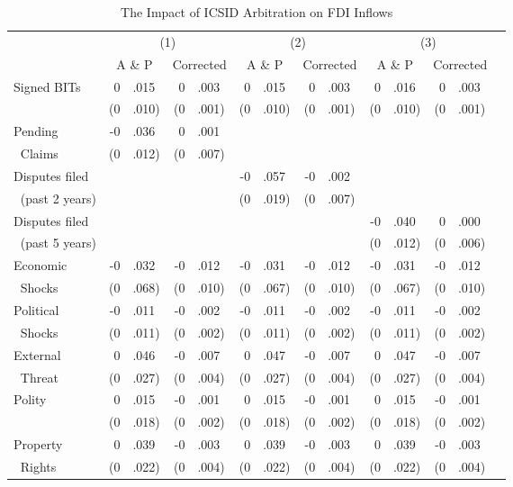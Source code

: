 \documentclass[12pt,onesided]{amsart}
\begin{document}
\begin{table}[ht]
\vspace{1cm}
\centering
{\footnotesize
\caption{The Impact of ICSID Arbitration on FDI Inflows}
\label{tab:allee}
\begin{tabular}{lr@{} lr@{}lr@{}lr@{}lr@{}lr@{}lr@{} }
	\hline\hline
	~ & \multicolumn{4}{c}{(1)} & \multicolumn{4}{c}{(2)} & \multicolumn{4}{c}{(3)} \\	
	~ & \multicolumn{2}{c}{A \& P} & \multicolumn{2}{c}{Corrected} & \multicolumn{2}{c}{A \& P} & \multicolumn{2}{c}{Corrected} & \multicolumn{2}{c}{A \& P} & \multicolumn{2}{c}{Corrected}
	 \\ \hline
	\multirow{2}{*}{Signed BITs} & 0&.015 & 0&.003 & 0&.015 & 0&.003 & 0&.016 & 0&.003 \\
	~ & (0&.010) & (0&.001) & (0&.010) & (0&.001) & (0&.010) & (0&.001) \\
	Pending &-0&.036 &0&.001 && && && \\
	$\;\;$Claims &(0&.012) &(0&.007) && && && \\
	Disputes filed && && &-0&.057 &-0&.002 && && \\
	$\;\;$(past 2 years) && && &(0&.019) &(0&.007) && && \\
	Disputes filed && && && && &-0&.040 &0&.000 \\
	$\;\;$(past 5 years) && && && && &(0&.012) &(0&.006) \\
	Economic & -0&.032 & -0&.012 & -0&.031 & -0&.012 & -0&.031 & -0&.012 \\
	$\;\;$Shocks & (0&.068) & (0&.010) & (0&.067) & (0&.010) & (0&.067) & (0&.010) \\
	Political & -0&.011 & -0&.002 & -0&.011 & -0&.002 & -0&.011 & -0&.002 \\
	$\;\;$Shocks & (0&.011) & (0&.002) & (0&.011) & (0&.002) & (0&.011) &(0&.002) \\
	External & 0&.046 & -0&.007 & 0&.047 & -0&.007 & 0&.047 & -0&.007 \\
	$\;\;$Threat & (0&.027) & (0&.004) & (0&.027) & (0&.004) & (0&.027) & (0&.004) \\
	\multirow{2}{*}{Polity} & 0&.015 & -0&.001 & 0&.015 & -0&.001 & 0&.015 & -0&.001 \\
	~ & (0&.018) & (0&.002) & (0&.018) & (0&.002) & (0&.018) &(0&.002) \\
	Property & 0&.039 & -0&.003 &  0&.039 & -0&.003 &  0&.039 & -0&.003 \\
	$\;\;$Rights & (0&.022) & (0&.004) & (0&.022) & (0&.004) & (0&.022) & (0&.004) \\

\end{tabular}}
\end{table}
\end{document}
